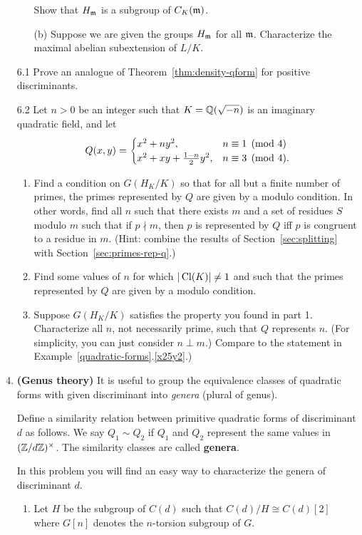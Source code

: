 \begin{enumerate}
\begin{enumerate}
\[\]
Show that $H_{\mathfrak{m}}$ is a subgroup of $C_K({\mathfrak{m}})$.
\item[(b)]
Suppose we are given the groups $H_{\mathfrak{m}}$ for all $\mathfrak{m}$. Characterize the maximal abelian subextension of $L/K$.
\end{enumerate}
\item[6.1] Prove an analogue of Theorem~\ref{thm:density-qform} for positive discriminants.
\item[6.2] Let $n>0$ be an integer such that $K=\mathbb{Q}(\sqrt{-n})$ is an imaginary quadratic field, and let 
\[
Q(x,y)=\begin{cases}
x^2+ny^2,&n\equiv 1\pmod 4\\
x^2+xy+\frac{1-n}{2}y^2,&n\equiv 3 \pmod 4. 
\end{cases}
\]
\begin{enumerate}
\item
Find a condition on $G(H_K/K)$ so that for all but a finite number of primes, the primes represented by $Q$ are given by a modulo condition. In other words, find all $n$ such that there exists $m$ and a set of residues $S$ modulo $m$ such that if $p\nmid m$, then $p$ is represented by $Q$ iff $p$ is congruent to a residue in $m$. (Hint: combine the results of Section~\ref{sec:splitting} with Section~\ref{sec:primes-rep-q}.)
\item
Find some values of $n$ for which $|\operatorname{Cl}(K)|\ne 1$ and such that the primes represented by $Q$ are given by a modulo condition.
\item
Suppose $G(H_K/K)$ satisfies the property you found in part 1. Characterize all $n$, not necessarily prime, such that $Q$ represents $n$. (For simplicity, you can just consider $n\perp m$.) Compare to the statement in Example~\ref{quadratic-forms}.\ref{x25y2}.)
\end{enumerate}
\item \textbf{(Genus theory)} It is useful to group the equivalence classes of quadratic forms with given discriminant into {\it genera} (plural of genus).

\begin{df}
Define a similarity relation between primitive quadratic forms of discriminant $d$ as follows. We say $Q_1\sim Q_2$ if $Q_1$ and $Q_2$ represent the same values in $(\mathbb{Z}/d\mathbb{Z})^{\times}$. The similarity classes are called \textbf{genera}.
\end{df}

In this problem you will find an easy way to characterize the genera of discriminant $d$.
\begin{enumerate}
\item
Let $H$ be the subgroup of $C(d)$ such that $C(d)/H\cong C(d)[2]$ where $G[n]$ denotes the $n$-torsion subgroup of $G$.


\end{enumerate}
\end{enumerate}
